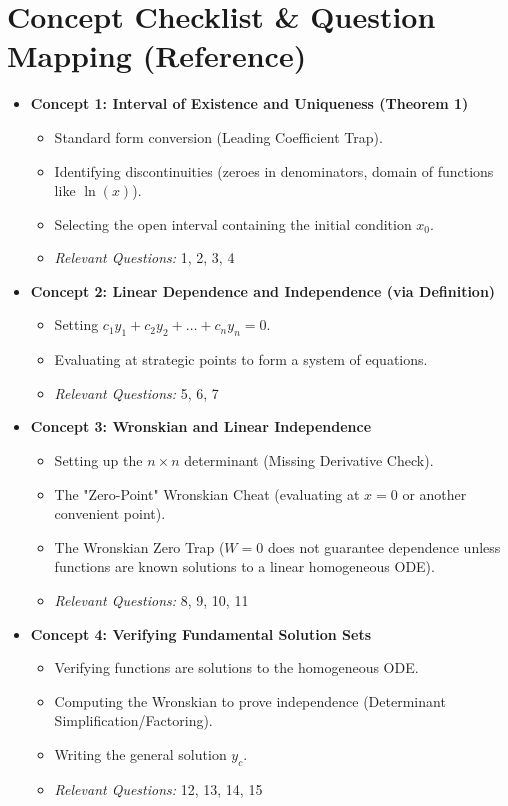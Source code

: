 \documentclass[12pt]{article}
\begin{document}
\section{Concept Checklist \& Question Mapping (Reference)}
\begin{itemize}
    \item \textbf{Concept 1: Interval of Existence and Uniqueness (Theorem 1)}
    \begin{itemize}
        \item Standard form conversion (Leading Coefficient Trap).
        \item Identifying discontinuities (zeroes in denominators, domain of functions like $\ln(x)$).
        \item Selecting the open interval containing the initial condition $x_0$.
        \item \textit{Relevant Questions:} 1, 2, 3, 4
    \end{itemize}
    
    \item \textbf{Concept 2: Linear Dependence and Independence (via Definition)}
    \begin{itemize}
        \item Setting $c_1y_1 + c_2y_2 + \dots + c_ny_n = 0$.
        \item Evaluating at strategic points to form a system of equations.
        \item \textit{Relevant Questions:} 5, 6, 7
    \end{itemize}

    \item \textbf{Concept 3: Wronskian and Linear Independence}
    \begin{itemize}
        \item Setting up the $n \times n$ determinant (Missing Derivative Check).
        \item The "Zero-Point" Wronskian Cheat (evaluating at $x=0$ or another convenient point).
        \item The Wronskian Zero Trap ($W=0$ does not guarantee dependence unless functions are known solutions to a linear homogeneous ODE).
        \item \textit{Relevant Questions:} 8, 9, 10, 11
    \end{itemize}

    \item \textbf{Concept 4: Verifying Fundamental Solution Sets}
    \begin{itemize}
        \item Verifying functions are solutions to the homogeneous ODE.
        \item Computing the Wronskian to prove independence (Determinant Simplification/Factoring).
        \item Writing the general solution $y_c$.
        \item \textit{Relevant Questions:} 12, 13, 14, 15
    \end{itemize}


\end{itemize}
\end{document}
